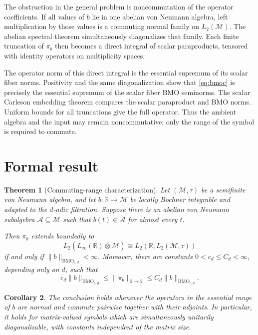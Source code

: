 \documentclass[11pt]{article}
\newtheorem{theorem}{Theorem}
\newtheorem{corollary}[theorem]{Corollary}
\newcommand{\M}{\mathcal M}
\newcommand{\A}{\mathcal A}
\newcommand{\BMO}{\mathrm{BMO}}
\begin{document}
The obstruction in the general problem is noncommutation of the operator
coefficients.  If all values of $b$ lie in one abelian von Neumann algebra,
left multiplication by those values is a commuting normal family on
$L_2(\M)$.  The abelian spectral theorem simultaneously diagonalizes that
family.  Each finite truncation of $\pi_b$ then becomes a direct integral of
scalar paraproducts, tensored with identity operators on multiplicity spaces.

The operator norm of this direct integral is the essential supremum of its
scalar fiber norms.  Positivity and the same diagonalization show that
\eqref{eq:bmoc} is precisely the essential supremum of the scalar fiber BMO
seminorms.  The scalar Carleson embedding theorem compares the scalar
paraproduct and BMO norms.  Uniform bounds for all truncations give the full
operator.  Thus the ambient algebra and the input may remain noncommutative;
only the range of the symbol is required to commute.

\section{Formal result}

\begin{theorem}[Commuting-range characterization]\label{thm:main}
Let $(\M,\tau)$ be a semifinite von Neumann algebra, and let
$b:\mathbb R\to\M$ be locally Bochner integrable and adapted to the $d$-adic
filtration.  Suppose there is an abelian von Neumann subalgebra
$\A\subseteq\M$ such that $b(t)\in\A$ for almost every $t$.

Then $\pi_b$ extends boundedly to
\[
 L_2(L_\infty(\mathbb R)\overline\otimes\M)
 \cong L_2(\mathbb R;L_2(\M,\tau))
\]
if and only if $\|b\|_{\BMO_{c,d}}<\infty$.  Moreover, there are constants
$0<c_d\le C_d<\infty$, depending only on $d$, such that
\begin{equation}\label{eq:equiv}
 c_d\|b\|_{\BMO_{c,d}}
 \le \|\pi_b\|_{2\to2}
 \le C_d\|b\|_{\BMO_{c,d}}.
\end{equation}
\end{theorem}

\begin{corollary}
The conclusion holds whenever the operators in the essential range of $b$
are normal and commute pairwise together with their adjoints.  In particular,
it holds for matrix-valued symbols which are simultaneously unitarily
diagonalizable, with constants independent of the matrix size.
\end{corollary}
\end{document}

